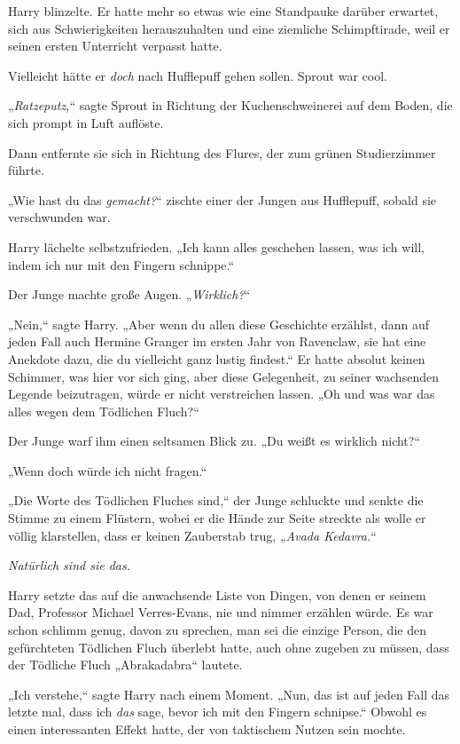 {Harry blinzelte. Er hatte mehr so etwas wie eine Standpauke darüber erwartet, sich aus Schwierigkeiten herauszuhalten und eine ziemliche Schimpftirade, weil er seinen ersten Unterricht verpasst hatte.

Vielleicht hätte er \emph{doch} nach Hufflepuff gehen sollen. Sprout war cool.

„\emph{Ratzeputz,}“ sagte Sprout in Richtung der Kuchenschweinerei auf dem Boden, die sich prompt in Luft auflöste.

Dann entfernte sie sich in Richtung des Flures, der zum grünen Studierzimmer führte.

„Wie hast du das \emph{gemacht?}“ zischte einer der Jungen aus Hufflepuff, sobald sie verschwunden war.

Harry lächelte selbstzufrieden. „Ich kann alles geschehen lassen, was ich will, indem ich nur mit den Fingern schnippe.“

Der Junge machte große Augen. „\emph{Wirklich?}“

„Nein,“ sagte Harry. „Aber wenn du allen diese Geschichte erzählst, dann auf jeden Fall auch Hermine Granger im ersten Jahr von Ravenclaw, sie hat eine Anekdote dazu, die du vielleicht ganz lustig findest.“ Er hatte absolut keinen Schimmer, was hier vor sich ging, aber diese Gelegenheit, zu seiner wachsenden Legende beizutragen, würde er nicht verstreichen lassen. „Oh und was war das alles wegen dem Tödlichen Fluch?“

Der Junge warf ihm einen seltsamen Blick zu. „Du weißt es wirklich nicht?“

„Wenn doch würde ich nicht fragen.“

„Die Worte des Tödlichen Fluches sind,“ der Junge schluckte und senkte die Stimme zu einem Flüstern, wobei er die Hände zur Seite streckte als wolle er völlig klarstellen, dass er keinen Zauberstab trug, „\emph{Avada Kedavra.}“

\emph{Natürlich sind sie das.}

Harry setzte das auf die anwachsende Liste von Dingen, von denen er seinem Dad, Professor Michael Verres-Evans, nie und nimmer erzählen würde. Es war schon schlimm genug, davon zu sprechen, man sei die einzige Person, die den gefürchteten Tödlichen Fluch überlebt hatte, auch ohne zugeben zu müssen, dass der Tödliche Fluch „Abrakadabra“ lautete.

„Ich verstehe,“ sagte Harry nach einem Moment. „Nun, das ist auf jeden Fall das letzte mal, dass ich \emph{das} sage, bevor ich mit den Fingern schnipse.“ Obwohl es einen interessanten Effekt hatte, der von taktischem Nutzen sein mochte.

}
